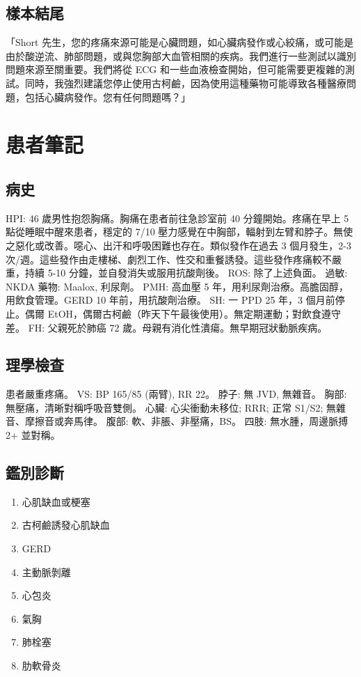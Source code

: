 \documentclass{article}
\begin{document}
\subsection{樣本結尾}
「Short 先生，您的疼痛來源可能是心臟問題，如心臟病發作或心絞痛，或可能是由於酸逆流、肺部問題，或與您胸部大血管相關的疾病。我們進行一些測試以識別問題來源至關重要。我們將從 ECG 和一些血液檢查開始，但可能需要更複雜的測試。同時，我強烈建議您停止使用古柯鹼，因為使用這種藥物可能導致各種醫療問題，包括心臟病發作。您有任何問題嗎？」

\section{患者筆記}

\subsection{病史}
HPI: 46 歲男性抱怨胸痛。胸痛在患者前往急診室前 40 分鐘開始。疼痛在早上 5 點從睡眠中醒來患者，穩定的 7/10 壓力感覺在中胸部，輻射到左臂和脖子。無使之惡化或改善。噁心、出汗和呼吸困難也存在。類似發作在過去 3 個月發生，2-3 次/週。這些發作由走樓梯、劇烈工作、性交和重餐誘發。這些發作疼痛較不嚴重，持續 5-10 分鐘，並自發消失或服用抗酸劑後。  
ROS: 除了上述負面。  
過敏: NKDA  
藥物: Maalox, 利尿劑。  
PMH: 高血壓 5 年，用利尿劑治療。高膽固醇，用飲食管理。GERD 10 年前，用抗酸劑治療。  
SH: 一 PPD 25 年，3 個月前停止。偶爾 EtOH，偶爾古柯鹼（昨天下午最後使用）。無定期運動；對飲食遵守差。  
FH: 父親死於肺癌 72 歲。母親有消化性潰瘍。無早期冠狀動脈疾病。

\subsection{理學檢查}
患者嚴重疼痛。  
VS: BP 165/85 (兩臂), RR 22。  
脖子: 無 JVD, 無雜音。  
胸部: 無壓痛，清晰對稱呼吸音雙側。  
心臟: 心尖衝動未移位; RRR; 正常 S1/S2; 無雜音、摩擦音或奔馬律。  
腹部: 軟、非脹、非壓痛，BS。  
四肢: 無水腫，周邊脈搏 2+ 並對稱。

\subsection{鑑別診斷}
\begin{enumerate}
\item 心肌缺血或梗塞
\item 古柯鹼誘發心肌缺血
\item GERD
\item 主動脈剝離
\item 心包炎
\item 氣胸
\item 肺栓塞
\item 肋軟骨炎
\end{enumerate}
\end{document}
